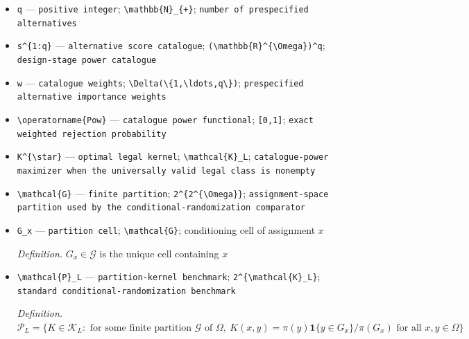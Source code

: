 \documentclass{article}
\begin{document}
\begin{itemize}
  \item \texttt{q} --- \texttt{positive integer}; \texttt{\textbackslash{}\allowbreak{}mathbb\{N\}\allowbreak{}\_\allowbreak{}\{+\allowbreak{}\}\allowbreak{}}; \texttt{number of prespecified alternatives}
  \item \texttt{s\textasciicircum{}\{1:\allowbreak{}q\}\allowbreak{}} --- \texttt{alternative score catalogue}; \texttt{(\textbackslash{}\allowbreak{}mathbb\{R\}\allowbreak{}\textasciicircum{}\{\textbackslash{}\allowbreak{}Omega\}\allowbreak{})\textasciicircum{}q}; \texttt{design-\allowbreak{}stage power catalogue}
  \item \texttt{w} --- \texttt{catalogue weights}; \texttt{\textbackslash{}\allowbreak{}Delta(\textbackslash{}\allowbreak{}\{1,\allowbreak{}\textbackslash{}\allowbreak{}ldots,\allowbreak{}q\textbackslash{}\allowbreak{}\}\allowbreak{})}; \texttt{prespecified alternative importance weights}
  \item \texttt{\textbackslash{}\allowbreak{}operatorname\{Pow\}\allowbreak{}} --- \texttt{catalogue power functional}; \texttt{[0,\allowbreak{}1]}; \texttt{exact weighted rejection probability}
  \item \texttt{K\textasciicircum{}\{\textbackslash{}\allowbreak{}star\}\allowbreak{}} --- \texttt{optimal legal kernel}; \texttt{\textbackslash{}\allowbreak{}mathcal\{K\}\allowbreak{}\_\allowbreak{}L}; \texttt{catalogue-\allowbreak{}power maximizer when the universally valid legal class is nonempty}
  \item \texttt{\textbackslash{}\allowbreak{}mathcal\{G\}\allowbreak{}} --- \texttt{finite partition}; \texttt{2\textasciicircum{}\{2\textasciicircum{}\{\textbackslash{}\allowbreak{}Omega\}\allowbreak{}\}\allowbreak{}}; \texttt{assignment-\allowbreak{}space partition used by the conditional-\allowbreak{}randomization comparator}
  \item \texttt{G\_\allowbreak{}x} --- \texttt{partition cell}; \texttt{\textbackslash{}\allowbreak{}mathcal\{G\}\allowbreak{}}; conditioning cell of assignment \(x\)
  \par\smallskip\noindent\emph{Definition.} \(G_x\in\mathcal{G}\) is the unique cell containing \(x\)
  \item \texttt{\textbackslash{}\allowbreak{}mathcal\{P\}\allowbreak{}\_\allowbreak{}L} --- \texttt{partition-\allowbreak{}kernel benchmark}; \texttt{2\textasciicircum{}\{\textbackslash{}\allowbreak{}mathcal\{K\}\allowbreak{}\_\allowbreak{}L\}\allowbreak{}}; \texttt{standard conditional-\allowbreak{}randomization benchmark}
  \par\smallskip\noindent\emph{Definition.} \(\mathcal{P}_L=\{K\in\mathcal{K}_L:\text{ for some finite partition }\mathcal{G}\text{ of }\Omega,\ K(x,y)=\pi(y)\mathbf{1}\{y\in G_x\}/\pi(G_x)\text{ for all }x,y\in\Omega\}\)

\end{itemize}
\end{document}
